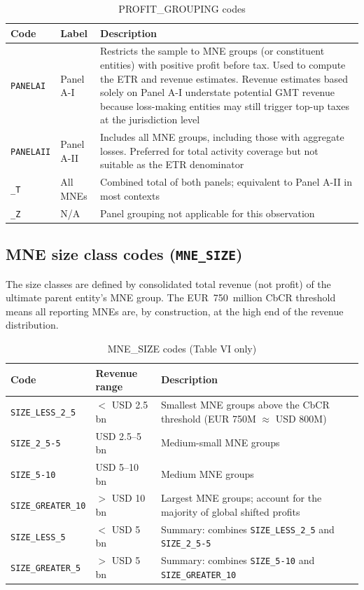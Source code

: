 \documentclass[11pt,a4paper]{article}
\newcommand{\code}[1]{\texttt{#1}}
\begin{document}
\begin{table}[H]
\centering
\caption{PROFIT\_GROUPING codes}
\label{tab:panelgroups}
\begin{tabular}{@{}llp{9cm}@{}}
\toprule
Code & Label & Description \\
\midrule
\code{PANELAI}  & Panel A-I & Restricts the sample to MNE groups (or constituent entities) with positive profit before tax. Used to compute the ETR and revenue estimates. Revenue estimates based solely on Panel A-I understate potential GMT revenue because loss-making entities may still trigger top-up taxes at the jurisdiction level \\
\code{PANELAII} & Panel A-II & Includes all MNE groups, including those with aggregate losses. Preferred for total activity coverage but not suitable as the ETR denominator \\
\code{\_T}       & All MNEs & Combined total of both panels; equivalent to Panel A-II in most contexts \\
\code{\_Z}       & N/A & Panel grouping not applicable for this observation \\
\bottomrule
\end{tabular}
\end{table}

\subsection{MNE size class codes (\texttt{MNE\_SIZE})}

The size classes are defined by consolidated total revenue (not profit) of the
ultimate parent entity's MNE group. The EUR~750~million CbCR threshold means all
reporting MNEs are, by construction, at the high end of the revenue distribution.

\begin{table}[H]
\centering
\caption{MNE\_SIZE codes (Table VI only)}
\label{tab:mnesize}
\begin{tabular}{@{}llp{8cm}@{}}
\toprule
Code & Revenue range & Description \\
\midrule
\code{SIZE\_LESS\_2\_5}   & $<$ USD 2.5 bn & Smallest MNE groups above the CbCR threshold (EUR 750M $\approx$ USD 800M) \\
\code{SIZE\_2\_5-5}       & USD 2.5--5 bn & Medium-small MNE groups \\
\code{SIZE\_5-10}         & USD 5--10 bn & Medium MNE groups \\
\code{SIZE\_GREATER\_10}  & $>$ USD 10 bn & Largest MNE groups; account for the majority of global shifted profits \\
\code{SIZE\_LESS\_5}      & $<$ USD 5 bn & Summary: combines \code{SIZE\_LESS\_2\_5} and \code{SIZE\_2\_5-5} \\
\code{SIZE\_GREATER\_5}   & $>$ USD 5 bn & Summary: combines \code{SIZE\_5-10} and \code{SIZE\_GREATER\_10} \\
\bottomrule
\end{tabular}
\end{table}
\end{document}
